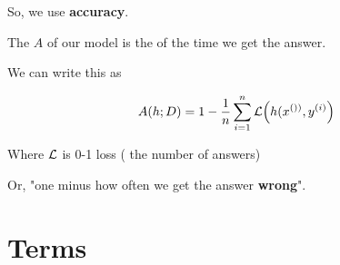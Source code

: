     So, we use \textbf{accuracy}.\\
    
    \begin{definition}
        The  $A$ of our model is the  of the time we get the  answer.
        
        We can write this as 
        
        \begin{equation*}
            A(h;D) = 1 - \frac{1}{n} \sum_{i=1}^n \mathcal{L}\Big(h(x^{())},y^{(i)} \Big)
        \end{equation*}
        
        Where $\mathcal{L}$ is 0-1 loss ( the number of  answers)
    \end{definition}
    
    Or, "one minus how often we get the answer \textbf{wrong}".
\pagebreak

\section{Terms}

